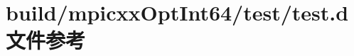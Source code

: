 \hypertarget{build_2mpicxxOptInt64_2test_2test_8d}{
\section{build/mpicxxOptInt64/test/test.d文件参考}
\label{build_2mpicxxOptInt64_2test_2test_8d}
}

